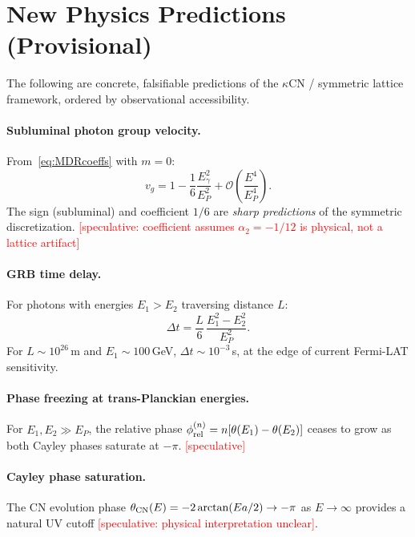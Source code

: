 \documentclass[11pt,a4paper]{article}
\begin{document}
\section{New Physics Predictions (Provisional)}
\label{sec:predictions}

The following are concrete, falsifiable predictions of the $\kappa$CN / symmetric lattice framework, ordered by observational accessibility.

\paragraph{Subluminal photon group velocity.}
From~\eqref{eq:MDRcoeffs} with $m=0$:
\begin{equation}
  v_g = 1 - \frac{1}{6}\frac{E_\gamma^2}{E_P^2} + \mathcal{O}\!\left(\frac{E^4}{E_P^4}\right).
  \label{eq:vgroup}
\end{equation}
The sign (subluminal) and coefficient $1/6$ are \emph{sharp predictions} of the symmetric discretization. \textcolor{red}{[speculative: coefficient assumes $\alpha_2=-1/12$ is physical, not a lattice artifact]}

\paragraph{GRB time delay.}
For photons with energies $E_1>E_2$ traversing distance $L$:
\begin{equation}
  \Delta t = \frac{L}{6}\,\frac{E_1^2 - E_2^2}{E_P^2}.
  \label{eq:GRBdelay}
\end{equation}
For $L\sim 10^{26}$\,m and $E_1\sim 100$\,GeV, $\Delta t\sim 10^{-3}$\,s, at the edge of current Fermi-LAT sensitivity.

\paragraph{Phase freezing at trans-Planckian energies.}
For $E_1,E_2\gg E_P$, the relative phase $\phi_{\rm rel}^{(n)} = n[\theta(E_1)-\theta(E_2)]$ ceases to grow as both Cayley phases saturate at $-\pi$. \textcolor{red}{[speculative]}

\paragraph{Cayley phase saturation.}
The CN evolution phase $\theta_{\rm CN}(E) = -2\arctan(Ea/2) \to -\pi$ as $E\to\infty$ provides a natural UV cutoff \textcolor{red}{[speculative: physical interpretation unclear]}.
\end{document}
